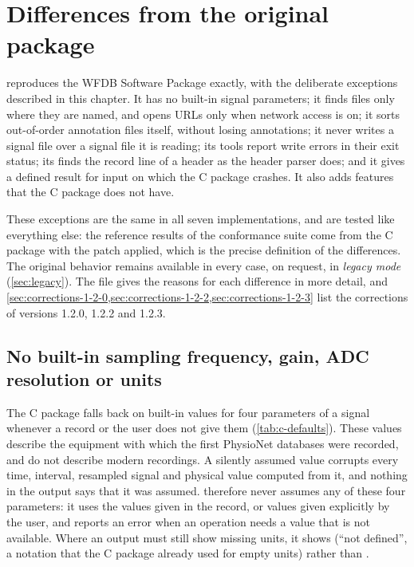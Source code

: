 \chapter{Differences from the original package}
\label{chap:behavior}

\wfdbx{} reproduces the WFDB Software Package \wfdbversion{} exactly, with
the deliberate exceptions described in this chapter. It has no built-in
signal parameters; it finds files only where they are named, and opens URLs
only when network access is on; it sorts out-of-order annotation files
itself, without losing annotations; it never writes a signal file over a
signal file it is reading; its tools report write errors in their exit
status; its  finds the record line of a header as the header
parser does; and it gives a defined result for input on which the C package
crashes. It also adds features that the C package does not have.

These exceptions are the same in all seven implementations, and are tested
like everything else: the reference results of the conformance suite come
from the C package with the patch 
applied, which is the precise definition of the differences. The original
behavior remains available in every case, on request, in \emph{legacy mode}
(\cref{sec:legacy}). The file  gives the reasons
for each difference in more detail, and
\cref{sec:corrections-1-2-0,sec:corrections-1-2-2,sec:corrections-1-2-3} list the
corrections of versions 1.2.0, 1.2.2 and 1.2.3.

\section{No built-in sampling frequency, gain, ADC resolution or units}
\label{sec:no-defaults}

The C package falls back on built-in values for four parameters of a
signal whenever a record or the user does not give them
(\cref{tab:c-defaults}). These values describe the equipment with which the
first PhysioNet databases were recorded, and do not describe modern
recordings. A silently assumed value corrupts every time, interval,
resampled signal and physical value computed from it, and nothing in the
output says that it was assumed. \wfdbx{} therefore never assumes any of
these four parameters: it uses the values given in the record, or values
given explicitly by the user, and reports an error when an operation needs a
value that is not available. Where an output must still show missing units,
it shows  (``not defined'', a notation that the C package already
used for empty units) rather than .

